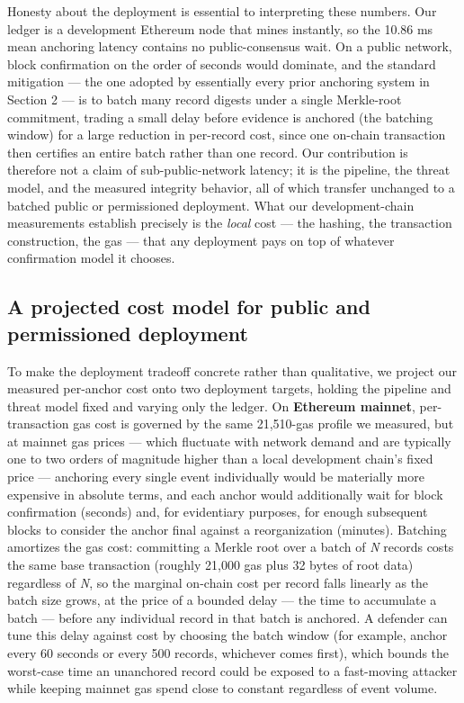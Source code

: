 \documentclass[journal]{IEEEtran}
\begin{document}
Honesty about the deployment is essential to interpreting these numbers. Our ledger is a development Ethereum node that mines instantly, so the 10.86 ms mean anchoring latency contains no public-consensus wait. On a public network, block confirmation on the order of seconds would dominate, and the standard mitigation --- the one adopted by essentially every prior anchoring system in Section 2 --- is to batch many record digests under a single Merkle-root commitment, trading a small delay before evidence is anchored (the batching window) for a large reduction in per-record cost, since one on-chain transaction then certifies an entire batch rather than one record. Our contribution is therefore not a claim of sub-public-network latency; it is the pipeline, the threat model, and the measured integrity behavior, all of which transfer unchanged to a batched public or permissioned deployment. What our development-chain measurements establish precisely is the \emph{local} cost --- the hashing, the transaction construction, the gas --- that any deployment pays on top of whatever confirmation model it chooses.

\subsection{A projected cost model for public and permissioned deployment}

To make the deployment tradeoff concrete rather than qualitative, we project our measured per-anchor cost onto two deployment targets, holding the pipeline and threat model fixed and varying only the ledger. On \textbf{Ethereum mainnet}, per-transaction gas cost is governed by the same 21,510-gas profile we measured, but at mainnet gas prices --- which fluctuate with network demand and are typically one to two orders of magnitude higher than a local development chain's fixed price --- anchoring every single event individually would be materially more expensive in absolute terms, and each anchor would additionally wait for block confirmation (seconds) and, for evidentiary purposes, for enough subsequent blocks to consider the anchor final against a reorganization (minutes). Batching amortizes the gas cost: committing a Merkle root over a batch of \emph{N} records costs the same base transaction (roughly 21,000 gas plus 32 bytes of root data) regardless of \emph{N}, so the marginal on-chain cost per record falls linearly as the batch size grows, at the price of a bounded delay --- the time to accumulate a batch --- before any individual record in that batch is anchored. A defender can tune this delay against cost by choosing the batch window (for example, anchor every 60 seconds or every 500 records, whichever comes first), which bounds the worst-case time an unanchored record could be exposed to a fast-moving attacker while keeping mainnet gas spend close to constant regardless of event volume.
\end{document}
